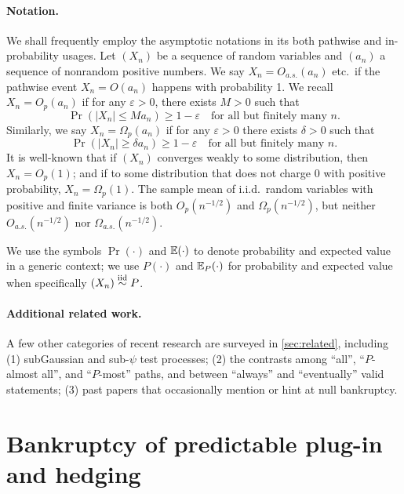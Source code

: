 \paragraph{Notation.} We shall frequently employ the asymptotic notations in its both pathwise and in-probability usages. Let $(X_n)$ be a sequence of random variables and $(a_n)$ a sequence of nonrandom positive numbers. We say $X_n = O_{a.s.}(a_n)$ etc.\ if the pathwise event $X_n=O(a_n)$ happens with probability 1.
We recall $X_n = O_p(a_n)$ if for any $\varepsilon > 0$, there exists $M > 0$ such that
\begin{equation}
  \Pr(|X_n| \le M a_n) \ge 1- \varepsilon \quad \text{for all but finitely many }n.
\end{equation}
Similarly, we say $X_n = \Omega_p(a_n)$ if for any $\varepsilon > 0$ there exists $\delta > 0$ such that
\begin{equation}
  \Pr(|X_n| \ge \delta a_n) \ge 1- \varepsilon \quad \text{for all but finitely many }n.
\end{equation}
It is well-known that if $(X_n)$ converges weakly to some distribution, then $X_n = O_p(1)$; and if to some distribution that does not charge 0 with positive probability, $X_n = \Omega_p(1)$. The sample mean of i.i.d.\ random variables with positive and finite variance is both $O_p(n^{-1/2})$ and $\Omega_p(n^{-1/2})$, but neither $O_{a.s.}(n^{-1/2})$ nor $\Omega_{a.s.}(n^{-1/2})$.

We use the symbols $\Pr(\cdot)$ and $\mathbb E(\cdot)$ to denote probability and expected value in a generic context; we use $P(\cdot)$ and $\mathbb E_P(\cdot)$ for probability and expected value when specifically $(X_n)\overset{\mathrm{iid}}{\sim} P$.


\paragraph{Additional related work.} A few other categories of recent research are surveyed in \cref{sec:related}, including (1) subGaussian and sub-$\psi$ test processes; (2) the contrasts among ``all'', ``$P$-almost all'', and ``$P$-most'' paths, and between ``always'' and ``eventually'' valid statements; (3) past papers that occasionally mention or hint at null bankruptcy.

\section{Bankruptcy of predictable plug-in and hedging}\label{sec:bankruptcy-predictable}
